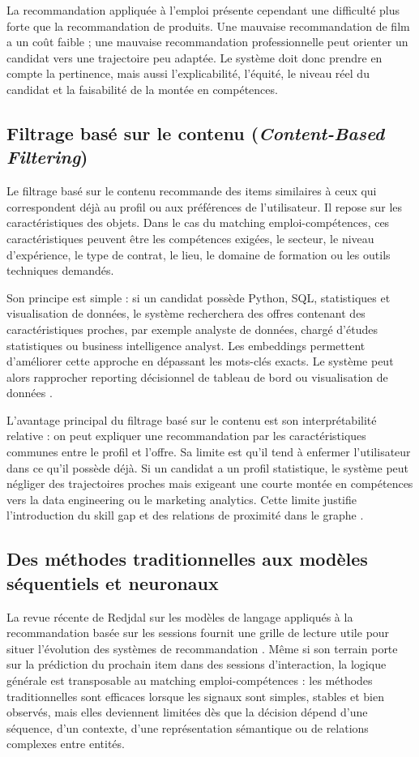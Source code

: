 \documentclass[12pt,twoside]{report}
\begin{document}
La recommandation appliquée à l'emploi présente cependant une difficulté plus forte que la recommandation de produits. Une mauvaise recommandation de film a un coût faible ; une mauvaise recommandation professionnelle peut orienter un candidat vers une trajectoire peu adaptée. Le système doit donc prendre en compte la pertinence, mais aussi l'explicabilité, l'équité, le niveau réel du candidat et la faisabilité de la montée en compétences.

\subsection{Filtrage basé sur le contenu (\textit{Content-Based Filtering})}
Le filtrage basé sur le contenu recommande des items similaires à ceux qui correspondent déjà au profil ou aux préférences de l'utilisateur. Il repose sur les caractéristiques des objets. Dans le cas du matching emploi-compétences, ces caractéristiques peuvent être les compétences exigées, le secteur, le niveau d'expérience, le type de contrat, le lieu, le domaine de formation ou les outils techniques demandés.

Son principe est simple : si un candidat possède Python, SQL, statistiques et visualisation de données, le système recherchera des offres contenant des caractéristiques proches, par exemple analyste de données, chargé d'études statistiques ou business intelligence analyst. Les embeddings permettent d'améliorer cette approche en dépassant les mots-clés exacts. Le système peut alors rapprocher \og reporting décisionnel \fg{} de \og tableau de bord \fg{} ou \og visualisation de données \fg{}.

L'avantage principal du filtrage basé sur le contenu est son interprétabilité relative : on peut expliquer une recommandation par les caractéristiques communes entre le profil et l'offre. Sa limite est qu'il tend à enfermer l'utilisateur dans ce qu'il possède déjà. Si un candidat a un profil statistique, le système peut négliger des trajectoires proches mais exigeant une courte montée en compétences vers la data engineering ou le marketing analytics. Cette limite justifie l'introduction du skill gap et des relations de proximité dans le graphe \cite{pazzani2007content}.

\subsection{Des méthodes traditionnelles aux modèles séquentiels et neuronaux}
La revue récente de Redjdal sur les modèles de langage appliqués à la recommandation basée sur les sessions fournit une grille de lecture utile pour situer l'évolution des systèmes de recommandation \cite{redjdal2024sbr}. Même si son terrain porte sur la prédiction du prochain item dans des sessions d'interaction, la logique générale est transposable au matching emploi-compétences : les méthodes traditionnelles sont efficaces lorsque les signaux sont simples, stables et bien observés, mais elles deviennent limitées dès que la décision dépend d'une séquence, d'un contexte, d'une représentation sémantique ou de relations complexes entre entités.
\end{document}
